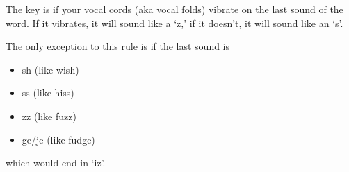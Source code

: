 \documentclass[title={January 9{,} 2024 Notes}]{com310notes}
\begin{document}
\maketitle
\newcommand{\z}[1]{#1 \textcolor{red}{z}}
\newcommand{\s}[1]{#1 \textcolor{blue}{s}}
\newcommand{\neither}[1]{\textcolor{green}{#1}}
\let\oldt\t
\let\oldd\d
\renewcommand{\t}[1]{#1 \textcolor{red}{t}}
\renewcommand{\d}[1]{#1 \textcolor{blue}{d}}
\newcommand{\id}[1]{#1 \textcolor{orange}{id}}

\begin{table}[H]
    \centering
\end{table}

\noindent The key is if your vocal cords (aka vocal folds) vibrate on the last sound of the word.
If it vibrates, it will sound like a `z,' if it doesn't, it will sound like an `s'.

\noindent The only exception to this rule is if the last sound is
\begin{itemize}
	\item sh (like wish)
	\item ss (like hiss)
	\item zz (like fuzz)
	\item ge/je (like fudge)
\end{itemize}
which would end in `iz'.
\end{document}
